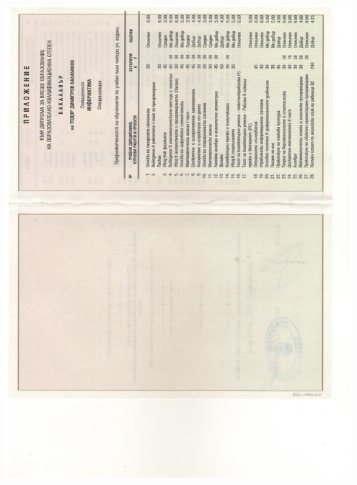 \documentclass[english,a4paper]{europasscv}
\begin{document}
\includegraphics[width=\textwidth,height=\textheight,keepaspectratio]{DiplomaNBU2006_3}
\end{document}
